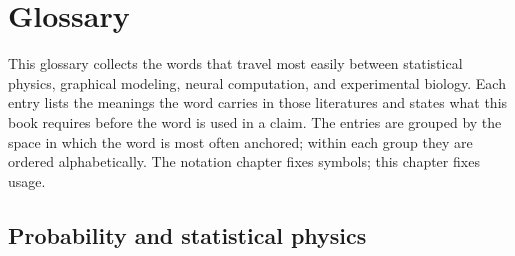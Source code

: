 \chapter*{Glossary}

This glossary collects the words that travel most easily between statistical physics, graphical
modeling, neural computation, and experimental biology.  Each entry lists the meanings the word
carries in those literatures and states what this book requires before the word is used in a
claim.  The entries are grouped by the space in which the word is most often anchored; within each
group they are ordered alphabetically.  The notation chapter fixes symbols; this chapter fixes
usage.

\section*{Probability and statistical physics}

